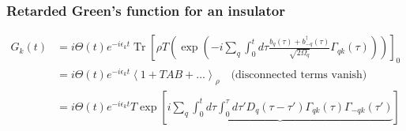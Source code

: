 \begin{frame}
    \frametitle{Retarded Green's function for an insulator}
\begin{align}
G_k(t)&= i \Theta(t) e^{-i \epsilon_k t} \operatorname{Tr}\left[\rho T \left(\exp \left(-i \sum_q \int_0^t d \tau \frac{b_q (\tau) + b_{-q}^\dagger (\tau)}{\sqrt{2 \Omega_q}} \Gamma_{q k}(\tau)\right)\right)\right]_0 \\
&= i \Theta(t) e^{-i \epsilon_k t} \left\langle 1+T AB + \ldots \right\rangle_\rho \quad \text{(disconnected terms vanish)} \label{ce:exp} \\
&= i \Theta(t) e^{-i \epsilon_k t} T \exp \left[ \underbrace{i \sum_q \int_0^t d \tau \int_0^\tau d \tau' D_q(\tau - \tau') \Gamma_{q k}(\tau) \Gamma_{-q k}(\tau')} \right] \label{final_ce}

\end{align}
\end{frame}
